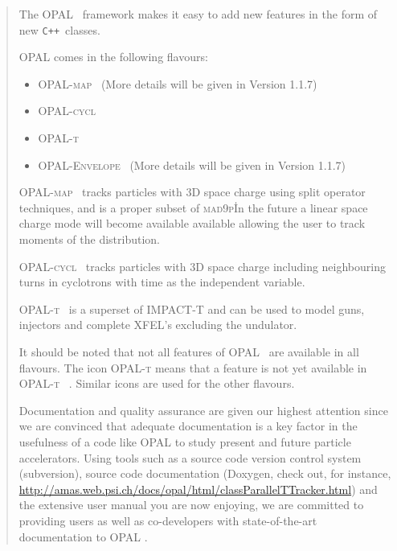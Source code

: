 \documentclass[12pt,a4paper]{report}
\newcommand{\madninep}{\textsc{mad9p}}
\newcommand{\opal}{\textsc{OPAL} }
\newcommand{\opalt}{\textsc{OPAL-t} }
\newcommand{\opalcycl}{\textsc{OPAL-cycl} }
\newcommand{\opalmap}{\textsc{OPAL-map} }
\newcommand{\opalenv}{\textsc{OPAL-Envelope} }
\newcommand{\noopalt}{\leftthumbsdown \opalt }
\newcommand{\latermore}{More details will be given in Version 1.1.7}
\begin{document}
\begin{titlepage}
\begin{quotation}
The \opal\ framework makes it easy to add new features in the form of new
\texttt{C++}~classes.

OPAL comes in the following flavours:
\begin{itemize}
\item \opalmap\ (\latermore)
\item \opalcycl 
\item \opalt
\item \opalenv\ (\latermore)
\end{itemize}

\opalmap\ tracks particles with 3D space charge using split operator techniques, and is a proper subset of \madninep\. In the future 
a linear space charge mode will become available available
allowing the user to track moments of the distribution. 

\opalcycl\ tracks particles with 3D space charge including neighbouring turns in cyclotrons
with time as the independent variable. 

\opalt\ is a superset of IMPACT-T \cite{qiang2005} and can be used to model guns, injectors and complete XFEL's excluding the undulator.

It should be noted that not all features of \opal\ are available in all flavours. The icon \noopalt means that a feature is not yet 
available in \opalt\ . Similar icons are used for the other flavours. 

Documentation and quality assurance are given our highest attention since we are convinced that adequate documentation 
is a key factor in the usefulness of a code like \opal to study present and future particle accelerators. 
 Using tools such as a source code version
control system (subversion), source code documentation (Doxygen, check out, for instance,  \url{http://amas.web.psi.ch/docs/opal/html/classParallelTTracker.html}) and the extensive user manual
you are now enjoying, we are committed to providing users as well as co-developers with 
state-of-the-art documentation to \opal.

\end{quotation}
\vfill
\end{titlepage}

\tableofcontents
\listoftables
\listoffigures



 















\appendix




\printindex
\end{document}
